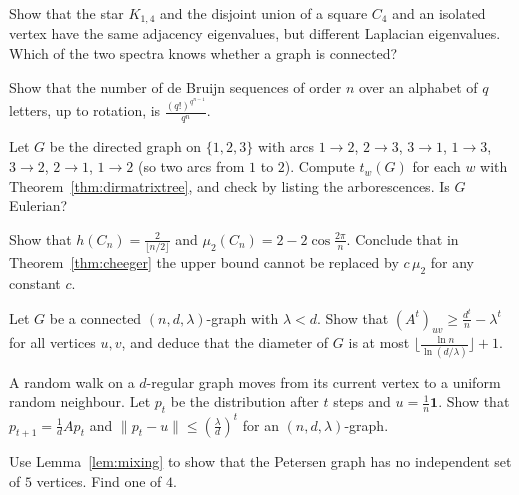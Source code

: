 \begin{exercise}[$\star$]\label{ex:cospectral}
Show that the star $K_{1,4}$ and the disjoint union of a square $C_4$ and an isolated vertex have the same adjacency eigenvalues, but different Laplacian eigenvalues. Which of the two
spectra knows whether a graph is connected?
\end{exercise}

\begin{exercise}[$\star\star$]\label{ex:debruijnq}
Show that the number of de Bruijn sequences of order $n$ over an alphabet of $q$ letters, up to rotation, is $\frac{(q!)^{q^{n-1}}}{q^n}$.
\end{exercise}

\begin{exercise}[$\star$]\label{ex:arborescences}
Let $G$ be the directed graph on $\{1,2,3\}$ with arcs $1\to2$, $2\to3$, $3\to1$, $1\to3$, $3\to2$, $2\to1$, $1\to2$ (so two arcs from $1$ to $2$). Compute $t_w(G)$ for each $w$ with
Theorem~\ref{thm:dirmatrixtree}, and check by listing the arborescences. Is $G$ Eulerian?
\end{exercise}

\begin{exercise}[$\star$]\label{ex:cheegercycle}
Show that $h(C_n)=\frac2{\lfloor n/2\rfloor}$ and $\mu_2(C_n)=2-2\cos\frac{2\pi}n$. Conclude that in Theorem~\ref{thm:cheeger} the upper bound cannot be replaced by $c\,\mu_2$ for any constant $c$.
\end{exercise}

\begin{exercise}[$\star\star$]\label{ex:diameter}
Let $G$ be a connected $(n,d,\lambda)$-graph with $\lambda<d$. Show that $(A^t)_{uv}\ge\frac{d^t}n-\lambda^t$ for all vertices $u,v$, and deduce that the diameter of $G$ is at most
$\bigl\lfloor\frac{\ln n}{\ln(d/\lambda)}\bigr\rfloor+1$.
\end{exercise}

\begin{exercise}[$\star$]\label{ex:walkmixing}
A random walk on a $d$-regular graph moves from its current vertex to a uniform random neighbour. Let $p_t$ be the distribution after $t$ steps and $u=\frac1n\mathbf1$. Show that $p_{t+1}=\frac1dAp_t$
and $\|p_t-u\|\le(\frac\lambda d)^t$ for an $(n,d,\lambda)$-graph.
\end{exercise}

\begin{exercise}[$\star$]\label{ex:petersenalpha}
Use Lemma~\ref{lem:mixing} to show that the Petersen graph has no independent set of $5$ vertices. Find one of $4$.
\end{exercise}

